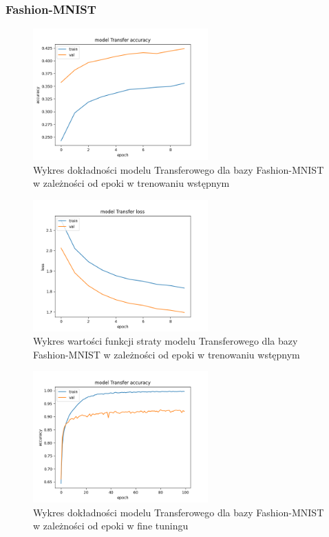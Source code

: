 \documentclass{article}
\begin{document}
\subsubsection{Fashion-MNIST}
\begin{figure}[H]
    \centering
    \includegraphics[width=0.6\textwidth]{../Saves/Transfer/fashion-mnist/Transfer_fashion-mnist_ep10_acc.png}
    \caption{Wykres dokładności modelu Transferowego dla bazy Fashion-MNIST w zależności od epoki w trenowaniu wstępnym}
\end{figure}

\begin{figure}[H]
    \centering
    \includegraphics[width=0.6\textwidth]{../Saves/Transfer/fashion-mnist/Transfer_fashion-mnist_ep10_loss.png}
    \caption{Wykres wartości funkcji straty modelu Transferowego dla bazy Fashion-MNIST w zależności od epoki w trenowaniu wstępnym}
\end{figure}

\begin{figure}[H]
    \centering
    \includegraphics[width=0.6\textwidth]{../Saves/Transfer/fashion-mnist/Transfer_fashion-mnist_ep100_acc.png}
    \caption{Wykres dokładności modelu Transferowego dla bazy Fashion-MNIST w zależności od epoki w fine tuningu}
\end{figure}
\end{document}
